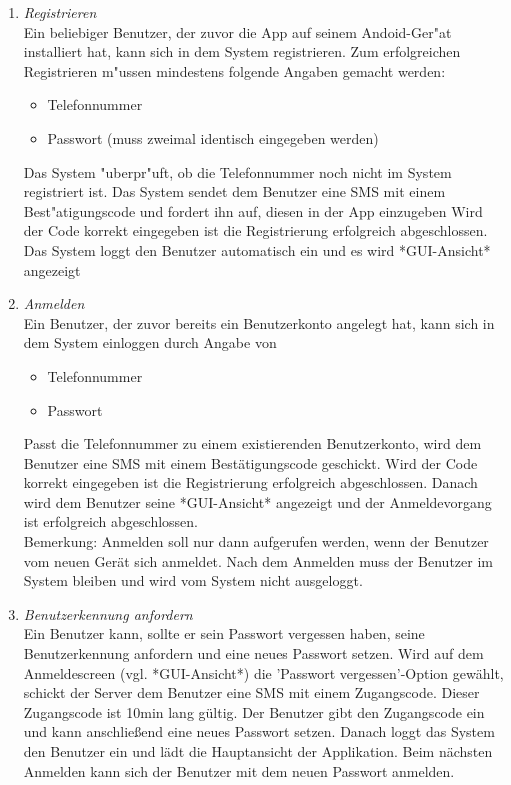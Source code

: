 \documentclass[parskip=full]{scrartcl}
\def\threedigits#1{%
  \ifnum#1<100 0\fi
  \ifnum#1<10 0\fi
  \number#1}
\begin{document}
\begin{enumerate}[label={\textbf{/F\protect\threedigits{\theenumi}0/}}, leftmargin=*]
	
	\item \textit{Registrieren} \\ Ein beliebiger Benutzer, der zuvor die App auf seinem Andoid-Ger"at installiert hat, kann sich in dem \gls{System} registrieren. Zum erfolgreichen Registrieren m"ussen mindestens folgende Angaben gemacht werden:
	\begin{itemize}
		\item Telefonnummer %
		\item Passwort (muss zweimal identisch eingegeben werden)
	\end{itemize}
	 Das System "uberpr"uft, ob die Telefonnummer noch nicht im System registriert ist. Das System sendet dem Benutzer eine SMS %
	 mit einem Best"atigungscode und fordert ihn auf, diesen in der App einzugeben %
	 Wird der Code korrekt eingegeben ist die Registrierung erfolgreich abgeschlossen. Das System loggt den Benutzer automatisch ein und es wird *GUI-Ansicht* angezeigt %
	 	
	\item \textit{Anmelden} \\ Ein Benutzer, der zuvor bereits ein Benutzerkonto angelegt hat, kann sich in dem System einloggen durch Angabe von
	\begin{itemize}
		\item Telefonnummer
		\item Passwort
	\end{itemize}
	Passt die Telefonnummer zu einem existierenden Benutzerkonto, wird dem Benutzer eine SMS mit einem Bestätigungscode geschickt. Wird der Code korrekt eingegeben ist die Registrierung erfolgreich abgeschlossen. Danach wird dem Benutzer seine *GUI-Ansicht* angezeigt und der Anmeldevorgang ist erfolgreich abgeschlossen.\\
Bemerkung: Anmelden soll nur dann aufgerufen werden, wenn der Benutzer vom neuen Gerät sich anmeldet. Nach dem Anmelden muss der Benutzer im System bleiben und wird vom System nicht ausgeloggt.
	
	\item \textit{Benutzerkennung anfordern} \\ Ein Benutzer kann, sollte er sein Passwort vergessen haben, seine Benutzerkennung anfordern und eine neues Passwort setzen. Wird auf dem Anmeldescreen (vgl. *GUI-Ansicht*) die 'Passwort vergessen'-Option gewählt, schickt der Server dem Benutzer eine SMS mit einem Zugangscode. Dieser Zugangscode ist 10min lang gültig. Der Benutzer gibt den Zugangscode ein und kann anschließend eine neues Passwort setzen. Danach loggt das System den Benutzer ein und lädt die Hauptansicht der Applikation. Beim nächsten Anmelden kann sich der Benutzer mit dem neuen Passwort anmelden.
	

\end{enumerate}
\end{document}
